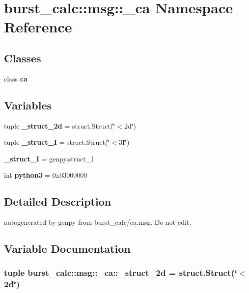 \section{burst\-\_\-calc\-:\-:msg\-:\-:\-\_\-ca \-Namespace \-Reference}
\label{namespaceburst__calc_1_1msg_1_1__ca}
\subsection*{\-Classes}
\begin{DoxyCompactItemize}
\item 
class {\bf ca}
\end{DoxyCompactItemize}
\subsection*{\-Variables}
\begin{DoxyCompactItemize}
\item 
tuple {\bf \-\_\-struct\-\_\-2d} = struct.\-Struct(\char`\"{}$<$2d\char`\"{})
\item 
tuple {\bf \-\_\-struct\-\_\-I} = struct.\-Struct(\char`\"{}$<$3\-I\char`\"{})
\item 
{\bf \-\_\-struct\-\_\-\-I} = genpy.\-struct\-\_\-\-I
\item 
int {\bf python3} = 0x03000000
\end{DoxyCompactItemize}


\subsection{\-Detailed \-Description}
\begin{DoxyVerb}autogenerated by genpy from burst_calc/ca.msg. Do not edit.\end{DoxyVerb}
 

\subsection{\-Variable \-Documentation}
\subsubsection[{\-\_\-struct\-\_\-2d}]{\setlength{\rightskip}{0pt plus 5cm}tuple {\bf burst\-\_\-calc\-::msg\-::\-\_\-ca\-::\-\_\-struct\-\_\-2d} = struct.\-Struct(\char`\"{}$<$2d\char`\"{})}\label{namespaceburst__calc_1_1msg_1_1__ca_a0d3373a6d2ae2d36e7555b28f2ed14f1}


